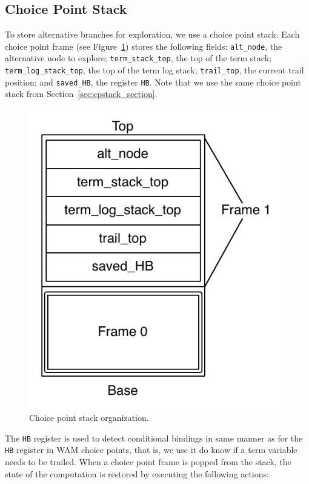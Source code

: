 \subsection{Choice Point Stack}

To store alternative branches for exploration, we use a choice point stack.
Each choice point frame
(see Figure~\ref{fig:choice_point_stack2})
stores the following fields:
\texttt{alt\_node}, the alternative node to explore;
\texttt{term\_stack\_top}, the top of the term stack;
\texttt{term\_log\_stack\_top}, the top of the term log stack;
\texttt{trail\_top}, the current trail position;
and \texttt{saved\_HB}, the register \texttt{HB}. Note that we use the same choice point stack
from Section~\ref{sec:cpstack_section}.

\begin{figure}[ht]
  \centering
    \includegraphics[scale=0.5]{choice_point_stack.pdf}
  \caption{Choice point stack organization.}
  \label{fig:choice_point_stack2}
\end{figure}

The \texttt{HB} register is used to detect conditional bindings in same manner as for the \texttt{HB} register in
WAM choice points, that is, we use it do know if a term variable needs to be trailed.
When a choice point frame is popped from the stack, the state of the computation is restored
by executing the following actions:

